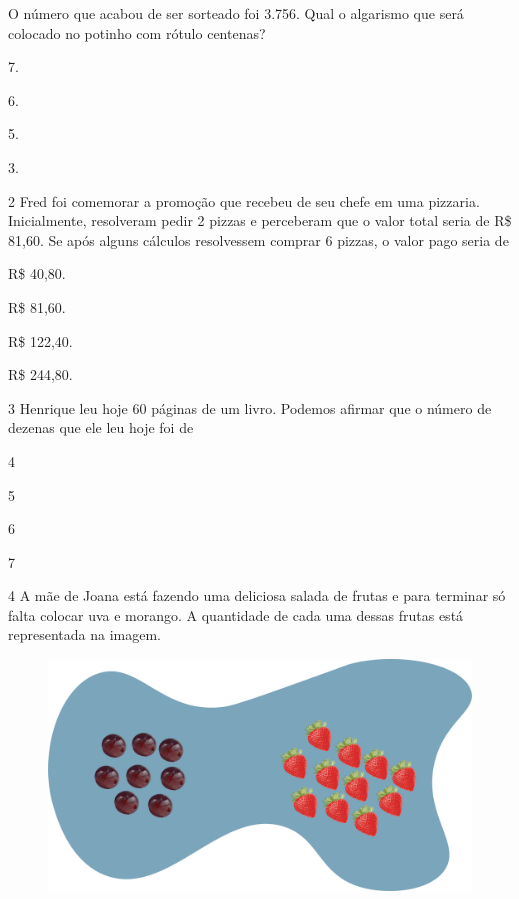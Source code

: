 O número que acabou de ser sorteado foi 3.756. Qual o algarismo que será colocado no potinho com rótulo centenas?

\begin{escolha}
\item
  7.
\item
  6.
\item
  5.
\item
  3.
\end{escolha}

\num{2} Fred foi comemorar a promoção que recebeu de seu chefe em uma pizzaria. Inicialmente, resolveram pedir 2 pizzas e perceberam que o valor total seria de R\$ 81,60. Se após alguns cálculos resolvessem comprar 6
pizzas, o valor pago seria de


\begin{escolha}
\item
  R\$ 40,80.
\item
  R\$ 81,60.
\item
  R\$ 122,40.
\item
  R\$ 244,80.
\end{escolha}


\num{3} Henrique leu hoje 60 páginas de um livro. Podemos afirmar que o número de dezenas que ele leu hoje foi de

\begin{multicols}{2}
\begin{escolha}
\item
  4
\item
  5
\item
  6
\item
  7
\end{escolha}
\end{multicols}

\pagebreak
\num{4} A mãe de Joana está fazendo uma deliciosa salada de frutas e para terminar só falta colocar uva e morango. A quantidade de cada uma dessas frutas está representada na imagem.

\begin{figure}[htpb!]
\centering
\includegraphics[width=.8\textwidth]{./media/image114.png}
\end{figure}

